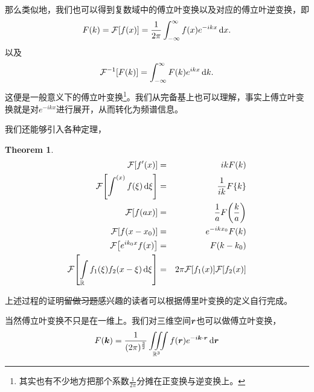 \documentclass[12pt,a4paper,openany,twoside]{book}
\newtheorem{theorem}{Theorem}[section]
\numberwithin{equation}{section}
\begin{document}
        那么类似地，我们也可以得到复数域中的傅立叶变换以及对应的傅立叶逆变换，即
        \begin{equation}
          F\qty(k)=\mathcal{F}\qty[f\qty(x)]=\frac{1}{2\pi}\int_{-\infty}^{\infty}{f\qty(x)e^{-ikx}\dd{x}} 
          .
        \end{equation}
        以及
        \begin{equation}
          \mathcal{F}^{-1}\qty[F\qty(k)]=\int_{-\infty}^\infty{F\qty(k)e^{ikx}\dd{k}}
          .
        \end{equation}
        这便是一般意义下的傅立叶变换\footnote{其实也有不少地方把那个系数$\frac{1}{2\pi}$分摊在正变换与逆变换上。}。我们从完备基上也可以理解，事实上傅立叶变换就是对$e^{-ikx}$进行展开，从而转化为频谱信息。

        我们还能够引入各种定理，
        \begin{theorem}
          \begin{align}
            \mathcal{F}\qty[f'\qty(x)]&=&ikF\qty(k)\\
            \mathcal{F}\qty[\int^\qty(x){f\qty(\xi)\dd{\xi}}]&=&\frac{1}{ik}F\qty{k}\\
            \mathcal{F}\qty[f\qty(ax)]&=&\frac{1}{a}F\qty(\frac{k}{a})\\
            \mathcal{F}\qty[f\qty(x-x_0)]&=&e^{-ikx_0}F\qty(k)\\
            \mathcal{F}\qty[e^{ik_0x}f\qty(x)]&=&F\qty(k-k_0)\\
            \mathcal{F}\qty[\int\limits_\mathbb{R}{f_1\qty(\xi)f_2\qty(x-\xi)\dd{\xi}}]&=&2\pi\mathcal{F}\qty[f_1\qty(x)]\mathcal{F}\qty[f_2\qty(x)]
          \end{align}
        \end{theorem}
        上述过程的证明\sout{留做习题}感兴趣的读者可以根据傅里叶变换的定义自行完成。

        当然傅立叶变换不只是在一维上。我们对三维空间$\vb*{r}$也可以做傅立叶变换，
        \begin{equation}
          F(\vb*{k})=\frac{1}{(2\pi)^{\frac{3}{2}}}\iiint\limits_{\mathbb{R}^3}{f(\vb*{r})e^{-i\vb*{k}\cdot\vb*{r}}\dd{\vb*{r}}}
        \end{equation}
\end{document}
